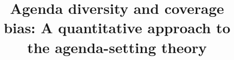 \documentclass{bmcart}
\begin{document}
\begin{frontmatter}

\begin{fmbox}


\title{Agenda diversity and coverage bias: A quantitative approach to the agenda-setting theory}


\author[
   addressref={aff1,aff2},                   %
   email={spinto@df.uba.ar}   %
]{ }
\author[
   addressref={aff3},                   %
]{ }
\author[
   addressref={aff1,aff2},                   %
]{ }
\author[
   addressref={aff1,aff2},                   %
   email={balen@df.uba.ar}   %
]{ }



\end{fmbox}
\end{frontmatter}
\end{document}
